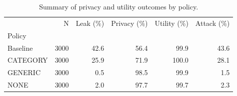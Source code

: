 \begin{table}
\caption{Summary of privacy and utility outcomes by policy.}
\label{tab:summary}
\begin{tabular}{lrrrrr}
\toprule
 & N & Leak (\%) & Privacy (\%) & Utility (\%) & Attack (\%) \\
Policy &  &  &  &  &  \\
\midrule
Baseline & 3000 & 42.6 & 56.4 & 99.9 & 43.6 \\
CATEGORY & 3000 & 25.9 & 71.9 & 100.0 & 28.1 \\
GENERIC & 3000 & 0.5 & 98.5 & 99.9 & 1.5 \\
NONE & 3000 & 2.0 & 97.7 & 99.7 & 2.3 \\
\bottomrule
\end{tabular}
\end{table}
